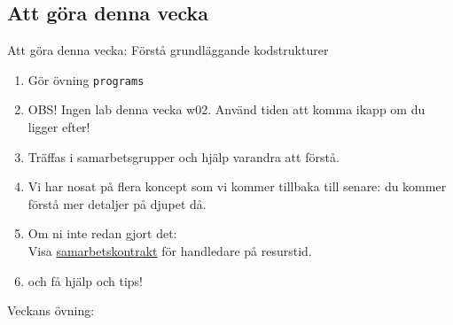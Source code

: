 \subsection{Att göra denna vecka}
\begin{SlideExtra}{Att göra denna vecka: Förstå grundläggande kodstrukturer}

\begin{enumerate}
\item Gör övning \texttt{programs}
\item OBS! Ingen lab denna vecka w02. Använd tiden att komma ikapp om du ligger efter!
\item Träffas i samarbetsgrupper och hjälp varandra att förstå.
\item Vi har nosat på flera koncept som vi kommer tillbaka till senare: du kommer förstå mer detaljer på djupet då.
\item Om ni inte redan gjort det: \\Visa \href{https://github.com/bjornregnell/lth-eda016-2015/tree/master/assignments}{samarbetskontrakt} för handledare på resurstid.
\item {} och få hjälp och tips!
\end{enumerate}
\end{SlideExtra}

\begin{SlideExtra}{Veckans övning: \texttt{\ExeWeekTWO}}\SlideFontTiny
\vspace{-0.5em}
\setlength{\leftmargini}{0pt}
\begin{itemize}

\end{itemize}
\end{SlideExtra}

